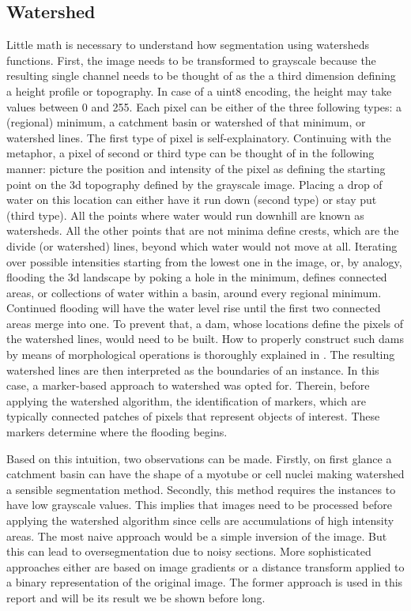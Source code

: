 \subsection{Watershed}
Little math is necessary to understand how segmentation using watersheds functions. First, the image needs to be transformed to grayscale because the resulting single channel needs to be thought of as the a third dimension defining a height profile or topography. In case of a uint8 encoding, the height may take values between 0 and 255. Each pixel can be either of the three following types: a (regional) minimum, a catchment basin or watershed of that minimum, or watershed lines. The first type of pixel is self-explainatory. Continuing with the metaphor, a pixel of second or third type can be thought of in the following manner: picture the position and intensity of the pixel as defining the starting point on the 3d topography defined by the grayscale image. Placing a drop of water on this location can either have it run down (second type) or stay put (third type). All the points where water would run downhill are known as watersheds. All the other points that are not minima define crests, which are the divide (or watershed) lines, beyond which water would not move at all. Iterating over possible intensities starting from the lowest one in the image, or, by analogy, flooding the 3d landscape by poking a hole in the minimum, defines connected areas, or collections of water within a basin, around every regional minimum. Continued flooding will have the water level rise until the first two connected areas merge into one. To prevent that, a dam, whose locations define the pixels of the watershed lines, would need to be built. How to properly construct such dams by means of morphological operations \cite{serra} is thoroughly explained in \cite{Gonzalez1992, coupriewatershed}. The resulting watershed lines are then interpreted as the boundaries of an instance. In this case, a marker-based approach to watershed \cite{meyer} was opted for. Therein, before applying the watershed algorithm, the identification of markers, which are typically connected patches of pixels that represent objects of interest. These markers determine where the flooding begins. 

Based on this intuition, two observations can be made. Firstly, on first glance a catchment basin can have the shape of a myotube or cell nuclei making watershed a sensible segmentation method. Secondly, this method requires the instances to have low grayscale values. This implies that images need to be processed before applying the watershed algorithm since cells are accumulations of high intensity areas. The most naive approach would be a simple inversion of the image. But this can lead to oversegmentation due to noisy sections. More sophisticated approaches either are based on image gradients or a distance transform applied to a binary representation of the original image. The former approach is used in this report and will be its result we be shown before long.

